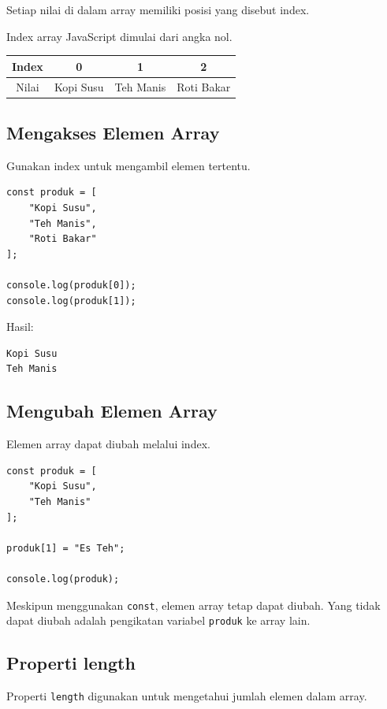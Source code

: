 \documentclass[12pt,a4paper]{article}
\begin{document}
Setiap nilai di dalam array memiliki posisi
yang disebut index.

Index array JavaScript dimulai dari angka nol.

\begin{center}
\begin{tabular}{c|c|c|c}
\toprule
Index & 0 & 1 & 2 \\
\midrule
Nilai & Kopi Susu & Teh Manis & Roti Bakar \\
\bottomrule
\end{tabular}
\end{center}

\subsection{Mengakses Elemen Array}

Gunakan index untuk mengambil elemen tertentu.

\begin{lstlisting}
const produk = [
    "Kopi Susu",
    "Teh Manis",
    "Roti Bakar"
];

console.log(produk[0]);
console.log(produk[1]);
\end{lstlisting}

Hasil:

\begin{lstlisting}
Kopi Susu
Teh Manis
\end{lstlisting}

\subsection{Mengubah Elemen Array}

Elemen array dapat diubah melalui index.

\begin{lstlisting}
const produk = [
    "Kopi Susu",
    "Teh Manis"
];

produk[1] = "Es Teh";

console.log(produk);
\end{lstlisting}

Meskipun menggunakan \texttt{const}, elemen
array tetap dapat diubah. Yang tidak dapat
diubah adalah pengikatan variabel \texttt{produk}
ke array lain.

\subsection{Properti length}

Properti \texttt{length} digunakan untuk mengetahui
jumlah elemen dalam array.
\end{document}

